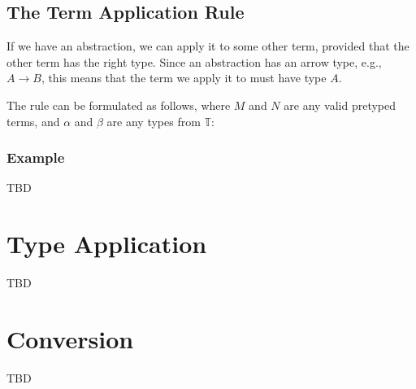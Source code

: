 \documentclass{book}
\numberwithin{equation}{chapter}
\begin{document}
\section{The Term Application Rule}

If we have an abstraction, we can apply it to some other term, provided that the other term has the right type. Since an abstraction has an arrow type, e.g., $A \rightarrow B$, this means that the term we apply it to must have type $A$. 

The rule can be formulated as follows, where $M$ and $N$ are any valid pretyped terms, and $\alpha$ and $\beta$ are any types from $\mathbb{T}$:

\begin{prooftree}
\end{prooftree}


\subsection{Example}

TBD



\chapter{Type Application}

TBD



\chapter{Conversion}

TBD



\end{document}
